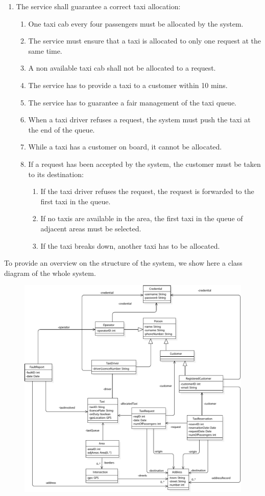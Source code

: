 \begin{enumerate}
	\item The service shall guarantee a correct taxi allocation: \begin{enumerate}
		\item One taxi cab every four passengers must be allocated by the system.
		\item The service must ensure that a taxi is allocated to only one request at the same time.
		\item A non available taxi cab shall not be allocated to a request.
		\item The service has to provide a taxi to a customer within 10 mins.
		\item The service has to guarantee a fair management of the taxi queue.
		\item When a taxi driver refuses a request, the system must push the taxi at the end of the queue.
		\item While a taxi has a customer on board, it cannot be allocated.
		\item If a request has been accepted by the system, the customer must be taken to its destination: \begin{enumerate}
			\item If the taxi driver refuses the request, the request is forwarded to the first taxi in the queue.
			\item If no taxis are available in the area, the first taxi in the queue of adjacent areas must be selected.
			\item If the taxi breaks down, another taxi has to be allocated.
		\end{enumerate}
	\end{enumerate}
 
\end{enumerate}


To provide an overview on the structure of the system, we show here a class diagram of the whole system.


\begin{figure}%
	\includegraphics[width=\textwidth]{img/C_ClassDiagram.pdf}%
\end{figure}


